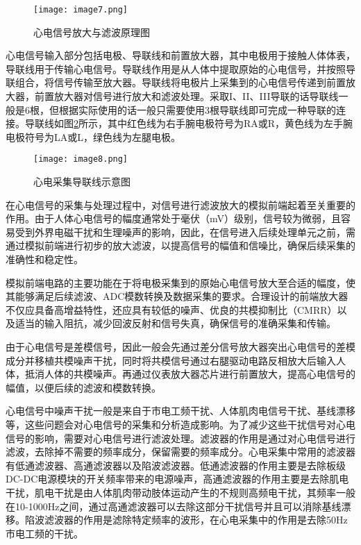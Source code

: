 \begin{figure}[H]
    \centering
    \texttt{[image: image7.png]}
    \caption{心电信号放大与滤波原理图\cite{现代医学电子仪器原理与设计}}
    \label{F.ECG_image7}
\end{figure}

心电信号输入部分包括电极、导联线和前置放大器，其中电极用于接触人体体表，导联线用于传输心电信号。导联线作用是从人体中提取原始的心电信号，并按照导联组合，将信号传输至放大器。导联线将电极片上采集到的心电信号传递到前置放大器，前置放大器对信号进行放大和滤波处理。采取I、II、III导联的话导联线一般是6根，但根据实际使用的话一般只需要使用3根导联线即可完成一种导联的连接。导联线如图\ref{F.ECG_image8}所示，其中红色线为右手腕电极符号为RA或R，黄色线为左手腕电极符号为LA或L，绿色线为左腿电极。

\begin{figure}[hbt]
    \centering
    \texttt{[image: image8.png]}
    \caption{心电采集导联线示意图}
    \label{F.ECG_image8}
\end{figure}

在心电信号的采集与处理过程中，对信号进行滤波放大的模拟前端起着至关重要的作用。由于人体心电信号的幅度通常处于毫伏（mV）级别，信号较为微弱，且容易受到外界电磁干扰和生理噪声的影响，因此，在信号进入后续处理单元之前，需通过模拟前端进行初步的放大滤波，以提高信号的幅值和信噪比，确保后续采集的准确性和稳定性。

模拟前端电路的主要功能在于将电极采集到的原始心电信号放大至合适的幅度，使其能够满足后续滤波、ADC模数转换及数据采集的要求。合理设计的前端放大器不仅应具备高增益特性，还应具有较低的噪声、优良的共模抑制比（CMRR）以及适当的输入阻抗，减少回波反射和信号失真，确保信号的准确采集和传输。

由于心电信号是差模信号，因此一般会先通过差分信号放大器突出心电信号的差模成分并移植共模噪声干扰，同时将共模信号通过右腿驱动电路反相放大后输入人体，抵消人体的共模噪声。再通过仪表放大器芯片进行前置放大，提高心电信号的幅值，以便后续的滤波和模数转换。

心电信号中噪声干扰一般是来自于市电工频干扰、人体肌肉电信号干扰、基线漂移等，这些问题会对心电信号的采集和分析造成影响。为了减少这些干扰信号对心电信号的影响，需要对心电信号进行滤波处理。滤波器的作用是通过对心电信号进行滤波，去除掉不需要的频率成分，保留需要的频率成分。心电采集中常用的滤波器有低通滤波器、高通滤波器以及陷波滤波器。低通滤波器的作用主要是去除板级DC-DC电源模块的开关频率带来的电源噪声，高通滤波器的作用主要是去除肌电干扰，肌电干扰是由人体肌肉带动肢体运动产生的不规则高频电干扰，其频率一般在10-1000Hz之间，通过高通滤波器可以去除这部分干扰信号并且可以消除基线漂移。陷波滤波器的作用是滤除特定频率的波形，在心电采集中的作用是去除50Hz市电工频的干扰。

